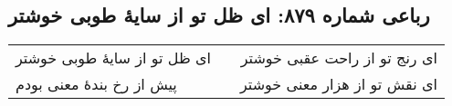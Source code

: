 \begin{center}
\section*{رباعی شماره ۸۷۹: ای ظل تو از سایهٔ طوبی خوشتر}
\label{sec:0879}
\begin{longtable}{l p{0.5cm} r}
ای ظل تو از سایهٔ طوبی خوشتر
&&
ای رنج تو از راحت عقبی خوشتر
\\
پیش از رخ بندهٔ معنی بودم
&&
ای نقش تو از هزار معنی خوشتر
\\
\end{longtable}
\end{center}
